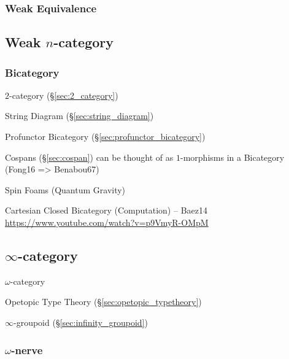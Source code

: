 \subsubsection{Weak Equivalence}\label{sec:weak_equivalence}



\subsection{Weak $n$-category}\label{sec:weak_ncategory}

\subsubsection{Bicategory}\label{sec:bicategory}

$2$-category (\S\ref{sec:2_category})

String Diagram (\S\ref{sec:string_diagram})

Profunctor Bicategory (\S\ref{sec:profunctor_bicategory})

Cospans (\S\ref{sec:cospan}) can be thought of as $1$-morphisms in a
Bicategory (Fong16 => Benabou67)

Spin Foams (Quantum Gravity)

Cartesian Closed Bicategory (Computation) -- Baez14
\url{https://www.youtube.com/watch?v=p9VmyR-OMpM}



\subsection{$\infty$-category}\label{sec:infinity_category}

$\omega$-category

Opetopic Type Theory (\S\ref{sec:opetopic_typetheory})

\fist $\infty$-groupoid (\S\ref{sec:infinity_groupoid})



\subsubsection{$\omega$-nerve}\label{sec:omega_nerve}



